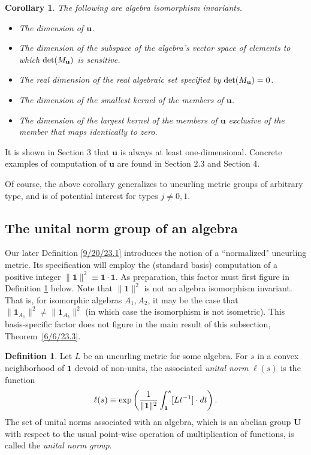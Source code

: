 \documentclass{amsart}
\numberwithin{equation}{section}
\newtheorem{corollary}[theorem]{Corollary}
\theoremstyle{definition}
\newtheorem{definition}[theorem]{Definition}
\numberwithin{theorem}{section}
\begin{document}
  \begin{corollary}\label{8/18/23.2} The following are algebra isomorphism invariants. \begin{itemize} \item The dimension of $\mathbf{u}$. \item The dimension of the subspace of the algebra's vector space of elements to which ${\rm det}(M_{\mathbf{u}})$ is sensitive. \item The real dimension of the real algebraic set specified by ${\rm det}(M_{\mathbf{u}}) = 0$.  \item The dimension of the smallest kernel of the members of $\mathbf{u}$.  \item The dimension of the largest kernel of the members of $\mathbf{u}$ exclusive of the member that maps identically to zero.\end{itemize} \end{corollary}

 It is shown in Section 3 that $\mathbf{u}$ is always at least one-dimensional.   Concrete examples of computation of $\mathbf{u}$ are found in Section 2.3 and Section 4.  
 
 Of course, the above corollary generalizes to uncurling metric groups of arbitrary type, and is of potential interest for types $j\ne 0,1$.

\subsection{The unital norm group of an algebra}
  
Our later Definition \ref{9/20/23.1} introduces the notion of a ``normalized" uncurling metric.  Its specification will employ the (standard basis) computation of a positive integer $\|\mathbf{1}\|^2 \equiv \mathbf{1} \cdot \mathbf{1}$. As preparation, this factor must first figure in Definition \ref{9/21/23.2} below.   Note that $\|\mathbf{1}\|^2$ is not an algebra isomorphism invariant.  That is, for isomorphic algebras $A_1,A_2$, it may be the case that $\|\mathbf{1}_{A_1}\|^2 \ne \|\mathbf{1}_{A_2}\|^2$ (in which case the isomorphism is not isometric).  This basis-specific factor does not figure in the main result of this subsection, \mbox{Theorem \ref{6/6/23.3}.}

  
  \begin{definition}\label{9/21/23.2} Let $L$ be an uncurling metric for some algebra.  For $s$ in a convex neighborhood of $\mathbf{1}$ devoid of non-units, the associated {\it unital norm} $ \ell(s)$ is the function
  \begin{equation}\label{11/7/20.2}   \ell(s) \equiv \exp\left({\frac{1}{\|{\bf 1}\|^2}\int_{\bf 1}^s [Lt^{-1}]\cdot dt}\right).\end{equation} 
   The set of unital norms associated with an algebra, which is an abelian group $\mathbf{U}$ with respect to the usual point-wise operation of multiplication of functions, is called the {\it unital norm group}. \end{definition} 
   
\end{document}
